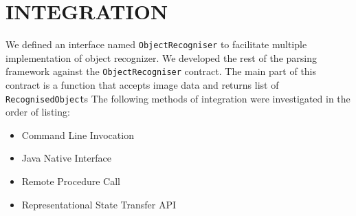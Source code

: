 \documentclass[letterpaper, 10 pt, conference]{ieeeconf}  %
\begin{document}
\section{INTEGRATION} \label{sec:integration}
We defined an interface named \texttt{ObjectRecogniser} to facilitate multiple implementation of object recognizer. We developed the rest of the parsing framework against the \texttt{ObjectRecogniser} contract. The main part of this contract is a function that accepts image data and returns list of \texttt{RecognisedObject}s
The following methods of integration were investigated in the order of listing:
\begin{itemize}
\item Command Line Invocation
\item Java Native Interface
\item Remote Procedure Call
\item Representational State Transfer API 
\end{itemize}
\end{document}
